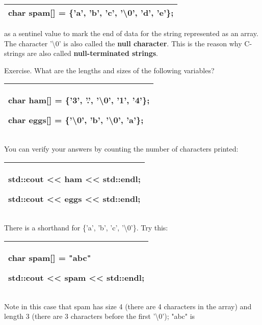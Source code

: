 \documentclass[
]{article}
\begin{document}
\begin{longtable}[]{@{}l@{}}
\toprule
\endhead
char spam{[}{]} = \{'a', 'b', 'c', '\textbackslash0', 'd', 'e'\};
\tabularnewline
\bottomrule
\end{longtable}

as a sentinel value to mark the end of data for the string represented
as an array. The character '\textbackslash0' is also called the
\textbf{null character}. This is the reason why C-strings are also
called \textbf{null-terminated strings}.

Exercise. What are the lengths and sizes of the following variables?

\begin{longtable}[]{@{}l@{}}
\toprule
\endhead
\begin{minipage}[t]{0.97\columnwidth}\raggedright
char ham{[}{]} = \{'3', '.', '\textbackslash0', '1', '4'\};

char eggs{[}{]} = \{'\textbackslash0', 'b', '\textbackslash0', 'a'\};
\strut
\end{minipage}\tabularnewline
\bottomrule
\end{longtable}

You can verify your answers by counting the number of characters
printed:

\begin{longtable}[]{@{}l@{}}
\toprule
\endhead
\begin{minipage}[t]{0.97\columnwidth}\raggedright
std::cout \textless\textless{} ham \textless\textless{} std::endl;

std::cout \textless\textless{} eggs \textless\textless{}
std::endl;\strut
\end{minipage}\tabularnewline
\bottomrule
\end{longtable}

There is a shorthand for \{'a', 'b', 'c', '\textbackslash0'\}. Try this:

\begin{longtable}[]{@{}l@{}}
\toprule
\endhead
\begin{minipage}[t]{0.97\columnwidth}\raggedright
char spam{[}{]} = "abc"

std::cout \textless\textless{} spam \textless\textless{}
std::endl;\strut
\end{minipage}\tabularnewline
\bottomrule
\end{longtable}

Note in this case that spam has size 4 (there are 4 characters in the
array) and length 3 (there are 3 characters before the first
'\textbackslash0'); "abc" is
\end{document}
